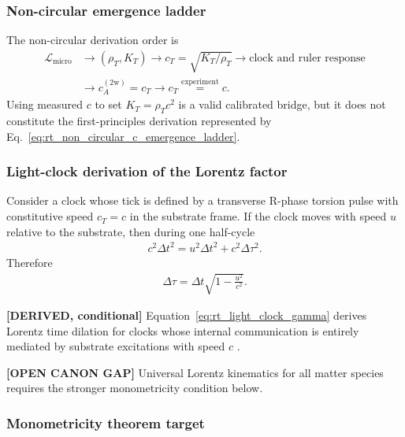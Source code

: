 \subsubsection{Non-circular emergence ladder}

The non-circular derivation order is
\begin{align}
    \mathcal L_{\mathrm{micro}}
    &\longrightarrow
    \left(\rho_T,K_T\right)
    \longrightarrow
    c_T=\sqrt{K_T/\rho_T}
    \longrightarrow
    \text{clock and ruler response}
    \nonumber\\
    &\longrightarrow
    c_A^{(2\mathrm w)}=c_T
    \longrightarrow
    c_T\stackrel{\mathrm{experiment}}{=}c .
    \label{eq:rt_non_circular_c_emergence_ladder}
\end{align}
Using measured \(c\) to set \(K_T=\rho_Tc^2\) is a valid calibrated bridge, but
it does not constitute the first-principles derivation represented by
Eq.~\eqref{eq:rt_non_circular_c_emergence_ladder}.

\subsubsection{Light-clock derivation of the Lorentz factor}

Consider a clock whose tick is defined by a transverse R-phase torsion pulse
with constitutive speed \(c_T=c\) in the substrate frame. If the clock moves with
speed \(u\) relative to the substrate, then during one half-cycle
\begin{align}
    c^2 \Delta t^2
    =
    u^2 \Delta t^2 + c^2 \Delta \tau^2 .
\end{align}
Therefore
\begin{align}
    \Delta \tau
    =
    \Delta t
    \sqrt{1-\frac{u^2}{c^2}} .
    \label{eq:rt_light_clock_gamma}
\end{align}

\textbf{[DERIVED, conditional]} Equation~\eqref{eq:rt_light_clock_gamma}
derives Lorentz time dilation for clocks whose internal communication is
entirely mediated by substrate excitations with speed \(c\) \cite{Einstein1905}.

\textbf{[OPEN CANON GAP]} Universal Lorentz kinematics for all matter species
requires the stronger monometricity condition below.

\subsubsection{Monometricity theorem target}

